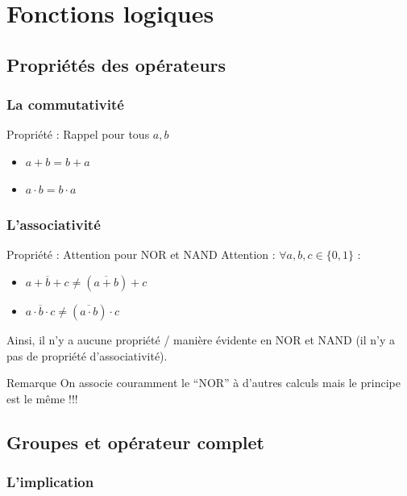 \documentclass[a4paper,12pt]{article}
\begin{document}
\newpage
\section{Fonctions logiques}

\subsection{Propriétés des opérateurs}

\subsubsection{La commutativité}

\begin{propbox}{Propriété : Rappel pour tous $a,b$}
\begin{itemize}
    \item $a + b = b + a$
    \item $a \cdot b = b \cdot a$
\end{itemize}
\end{propbox}

\subsubsection{L'associativité}

\begin{propbox}{Propriété : Attention pour NOR et NAND}
Attention : $\forall a,b,c \in \{0,1\}$ :
\begin{itemize}
    \item $\overline{a + b + c} \neq (\overline{a + b}) + c$
    \item $\overline{a \cdot b \cdot c} \neq (\overline{a \cdot b}) \cdot c$
\end{itemize}

Ainsi, il n'y a aucune propriété / manière évidente en NOR et NAND (il n'y a pas de propriété d'associativité).
\end{propbox}

\begin{examplebox}{Remarque}
On associe couramment le ``NOR'' à d'autres calculs mais le principe est le même !!!
\end{examplebox}

\subsection{Groupes et opérateur complet}

\subsubsection{L'implication}
\end{document}
